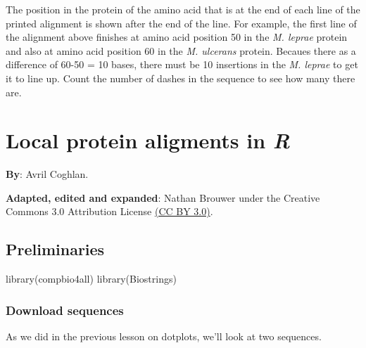 \documentclass[
]{book}
\newenvironment{Shaded}{\begin{snugshade}}{\end{snugshade}}
\newcommand{\FunctionTok}[1]{\textcolor[rgb]{0.00,0.00,0.00}{#1}}
\newcommand{\NormalTok}[1]{#1}
\begin{document}
The position in the protein of the amino acid that is at the end of each line of the printed alignment is shown after the end of the line. For example, the first line of the alignment above finishes at amino acid position 50 in the \emph{M. leprae} protein and also at amino acid position 60 in the \emph{M. ulcerans} protein. Becaues there as a difference of 60-50 = 10 bases, there must be 10 insertions in the \emph{M. leprae} to get it to line up. Count the number of dashes in the sequence to see how many there are.

\hypertarget{local-protein-aligments-in-r}{%
\chapter{\texorpdfstring{Local protein aligments in \emph{R}}{Local protein aligments in R}}\label{local-protein-aligments-in-r}}

\textbf{By}: Avril Coghlan.

\textbf{Adapted, edited and expanded}: Nathan Brouwer under the Creative Commons 3.0 Attribution License \href{https://creativecommons.org/licenses/by/3.0/}{(CC BY 3.0)}.

\hypertarget{preliminaries-6}{%
\section{Preliminaries}\label{preliminaries-6}}

\begin{Shaded}
\begin{Highlighting}[]
\FunctionTok{library}\NormalTok{(compbio4all)}
\FunctionTok{library}\NormalTok{(Biostrings)}
\end{Highlighting}
\end{Shaded}

\hypertarget{download-sequences-2}{%
\subsection{Download sequences}\label{download-sequences-2}}

As we did in the previous lesson on dotplots, we'll look at two sequences.
\end{document}
